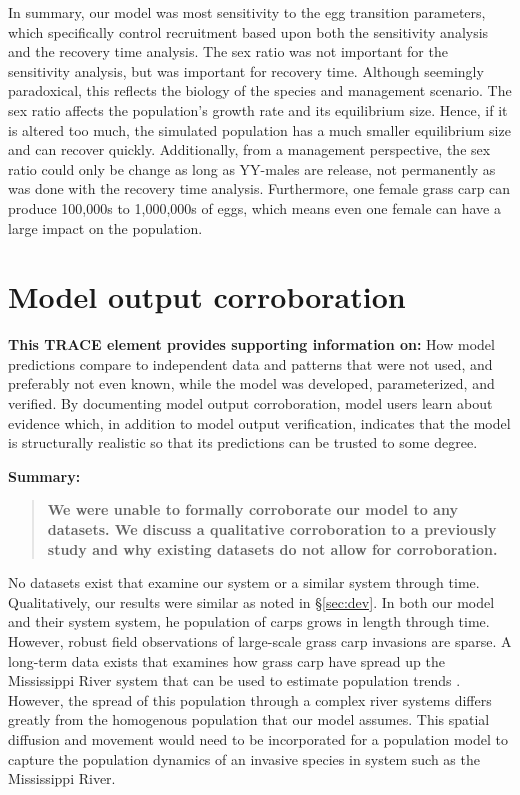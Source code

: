 \documentclass{article}[12pt]
\begin{document}
In summary, our model was most sensitivity to the egg transition parameters, which specifically control recruitment based upon both the sensitivity analysis and the recovery time analysis.
The sex ratio was not important for the sensitivity analysis, but was important for recovery time. 
Although seemingly paradoxical, this reflects the biology of the species and management scenario.  
The sex ratio affects the population's growth rate and its equilibrium size.
Hence, if it is altered too much, the simulated population has a much smaller equilibrium size and can recover quickly.
Additionally, from a management perspective, the sex ratio could only be change as long as YY-males are release, not permanently  as was done with the recovery time analysis.
Furthermore, one female grass carp can produce 100,000s to 1,000,000s of eggs, which means even one female can have a large impact on the population. 


\section{Model output corroboration}

\textbf{This TRACE element provides supporting information on:}  How model predictions compare to independent data and patterns that were not used, and preferably not even known, while the model was developed, parameterized, and verified. By documenting model output corroboration, model users learn about evidence which, in addition to model output verification, indicates that the model is structurally realistic so that its predictions can be trusted to some degree. 

\textbf{Summary:}
\begin{verse}
\textbf{
We were unable to formally corroborate our model to any datasets.
We discuss a qualitative corroboration to a previously study and why existing datasets do not allow for corroboration.
}
\end{verse}

No datasets exist that examine our system or a similar system through time.
Qualitatively, our results were similar \citet{martyn1986mapping} as noted in \S \ref{sec:dev}.
In both our model and their system system, he population of carps grows in length through time. 
However, robust field observations of large-scale grass carp invasions are sparse. 
A long-term data exists that examines how grass carp have spread up the Mississippi River system \citep{Ickes:2014} that can be used to estimate population trends \citep[e.g.,][]{EricksonAcceptedEcoInd}.
However, the spread of this population through a complex river systems differs greatly from the homogenous population that our model assumes. 
This spatial diffusion and movement would need to be incorporated for a population model to capture the population dynamics of an invasive species in system such as the Mississippi River. 




\end{document}
